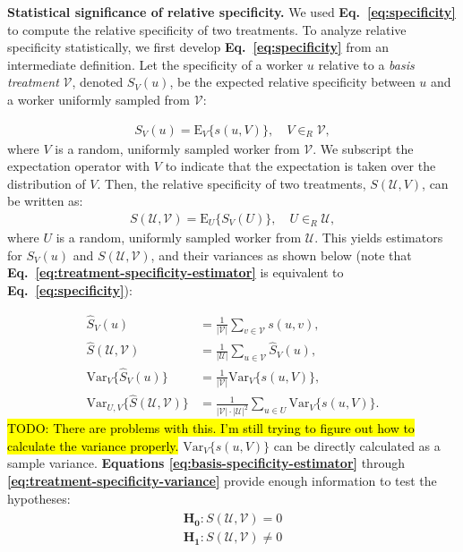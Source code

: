 \documentclass[a4paper]{report}
\newcommand{\td}[1]{{\color{blu}\hl{TODO: #1}}}
\begin{document}
\textbf{Statistical significance of relative specificity.}
We used \textbf{Eq.~\ref{eq:specificity}} to compute the relative specificity
of two treatments.  To analyze relative specificity statistically,
we first develop \textbf{Eq.~\ref{eq:specificity}} from an intermediate 
definition.  Let the specificity of a worker $u$ relative to a 
\textit{basis treatment} $\mathcal{V}$, denoted $S_V(u)$, be the expected 
relative specificity between $u$ and a worker uniformly sampled from 
$\mathcal{V}$:

\begin{align}
	S_V(u) =  \text{E}_V\{s(u,V)\}, \quad V \in_R \mathcal{V},
		\label{eq:basis-specificity}
\end{align}
where $V$ is a random, uniformly sampled worker from $\mathcal{V}$.  We 
subscript the expectation operator with $V$ to indicate 
that the expectation is taken over the distribution of $V$.  Then, the 
relative specificity of two treatments, $S(\mathcal{U},{V})$, can be 
written as:
\begin{align}
	S(\mathcal{U},\mathcal{V}) = 
		\text{E}_U\{S_V(U)\}, \quad U \in_R \mathcal{U},
		\label{eq:treatment-specificity}
\end{align}
where $U$ is a random, uniformly sampled worker from $\mathcal{U}$.  This 
yields 
estimators for $S_V(u)$ and $S(\mathcal{U}, \mathcal{V})$, and their variances
as shown below (note that 
\textbf{Eq.~\ref{eq:treatment-specificity-estimator}} is
equivalent to \textbf{Eq.~\ref{eq:specificity}}):

\begin{align}
	\hat{S}_V(u) &= \frac{1}{|\mathcal{V}|} \sum_{v \in \mathcal{V}} s(u,v), 
		\label{eq:basis-specificity-estimator} \\
		\hat{S}(\mathcal{U},\mathcal{V}) 
		&= \frac{1}{|\mathcal{U}|} \sum_{u \in \mathcal{V}} \hat{S}_V(u),
		\label{eq:treatment-specificity-estimator} \\
		\text{Var}_V\{\hat{S}_V(u)\} 
			&= \frac{1}{|\mathcal{V}|}\text{Var}_V\{s(u,V)\},
		\label{eq:basis-specificity-variance} \\
		\text{Var}_{U,V}\{\hat{S}(\mathcal{U},\mathcal{V})\} 
			&= \frac{1}{|\mathcal{V}|\cdot|\mathcal{U}|^2} 
			\sum_{u\in U}\text{Var}_V\{{s}(u,V)\}.
		\label{eq:treatment-specificity-variance}
\end{align}
\td{There are problems with this.  I'm still trying to figure out how to
	calculate the variance properly.}
$\text{Var}_V\{s(u,V)\}$ can be directly calculated as a sample variance.
\textbf{Equations \ref{eq:basis-specificity-estimator}} through 
\textbf{\ref{eq:treatment-specificity-variance}} provide enough information to test the hypotheses:
\begin{align}
	\begin{matrix}
		\mathbf{H_0}: S(\mathcal{U}, \mathcal{V}) = 0 \\[0.5em]
		\mathbf{H_1}: S(\mathcal{U}, \mathcal{V}) \neq 0
	\end{matrix}
\end{align}
\end{document}
